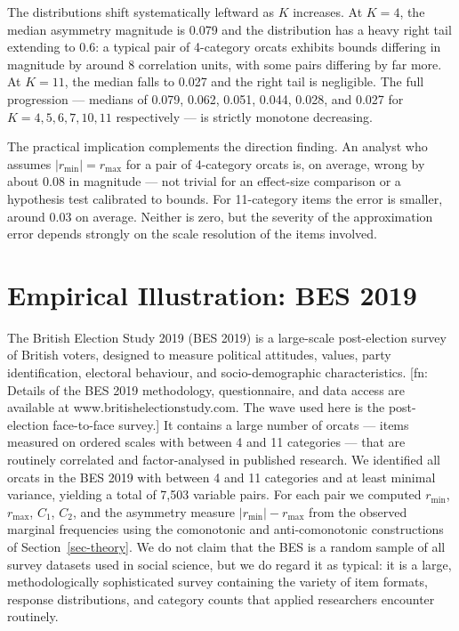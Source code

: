 \documentclass[
  12pt,
]{article}
\theoremstyle{plain}
\theoremstyle{definition}
\theoremstyle{remark}
\begin{document}
The distributions shift systematically leftward as \(K\) increases. At
\(K = 4\), the median asymmetry magnitude is 0.079 and the distribution
has a heavy right tail extending to 0.6: a typical pair of 4-category
orcats exhibits bounds differing in magnitude by around 8 correlation
units, with some pairs differing by far more. At \(K = 11\), the median
falls to 0.027 and the right tail is negligible. The full progression
--- medians of 0.079, 0.062, 0.051, 0.044, 0.028, and 0.027 for
\(K = 4, 5, 6, 7, 10, 11\) respectively --- is strictly monotone
decreasing.

The practical implication complements the direction finding. An analyst
who assumes \(|r_{\min}| = r_{\max}\) for a pair of 4-category orcats
is, on average, wrong by about 0.08 in magnitude --- not trivial for an
effect-size comparison or a hypothesis test calibrated to bounds. For
11-category items the error is smaller, around 0.03 on average. Neither
is zero, but the severity of the approximation error depends strongly on
the scale resolution of the items involved.

\section{Empirical Illustration: BES 2019}\label{sec-bes}

The British Election Study 2019 (BES 2019) is a large-scale
post-election survey of British voters, designed to measure political
attitudes, values, party identification, electoral behaviour, and
socio-demographic characteristics. {[}fn: Details of the BES 2019
methodology, questionnaire, and data access are available at
www.britishelectionstudy.com. The wave used here is the post-election
face-to-face survey.{]} It contains a large number of orcats --- items
measured on ordered scales with between 4 and 11 categories --- that are
routinely correlated and factor-analysed in published research. We
identified all orcats in the BES 2019 with between 4 and 11 categories
and at least minimal variance, yielding a total of 7,503 variable pairs.
For each pair we computed \(r_{\min}\), \(r_{\max}\), \(C_1\), \(C_2\),
and the asymmetry measure \(|r_{\min}| - r_{\max}\) from the observed
marginal frequencies using the comonotonic and anti-comonotonic
constructions of Section~\ref{sec-theory}. We do not claim that the BES
is a random sample of all survey datasets used in social science, but we
do regard it as typical: it is a large, methodologically sophisticated
survey containing the variety of item formats, response distributions,
and category counts that applied researchers encounter routinely.
\end{document}
